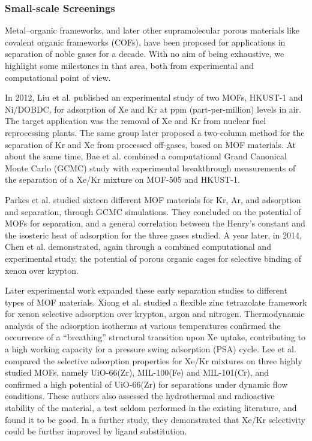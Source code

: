 \documentclass[main.tex]{subfiles}
\begin{document}
\subsubsection{Small-scale Screenings}

Metal--organic frameworks, and later other supramolecular porous materials like covalent organic frameworks (COFs), have been proposed for applications in separation of noble gases for a decade. With no aim of being exhaustive, we highlight some milestones in that area, both from experimental and computational point of view.

In 2012, Liu et al.\cite{Liu_2012} published an experimental study of two MOFs, HKUST-1 and Ni/DOBDC, for adsorption of Xe and Kr at ppm (part-per-million) levels in air. The target application was the removal of Xe and Kr from nuclear fuel reprocessing plants. The same group later proposed a two-column method for the separation of Kr and Xe from processed off-gases\cite{Liu_2014}, based on MOF materials. At about the same time, Bae et al.\cite{Bae_2013} combined a computational Grand Canonical Monte Carlo (GCMC) study with experimental breakthrough measurements of the separation of a Xe/Kr mixture on MOF-505 and HKUST-1.

Parkes et al.\cite{Parkes_2013} studied sixteen different MOF materials for Kr, Ar, and  adsorption and separation, through GCMC simulations. They concluded on the potential of MOFs for separation, and a general correlation between the Henry's constant and the isosteric heat of adsorption for the three gases studied. A year later, in 2014, Chen et al.\cite{Chen_2014} demonstrated, again through a combined computational and experimental study, the potential of porous organic cages for selective binding of xenon over krypton.

Later experimental work expanded these early separation studies to different types of MOF materials. Xiong et al.\cite{Xiong_2015} studied a flexible zinc tetrazolate framework for xenon selective adsorption over krypton, argon and nitrogen. Thermodynamic analysis of the adsorption isotherms at various temperatures confirmed the occurrence of a ``breathing'' structural transition upon Xe uptake, contributing to a high working capacity for a pressure swing adsorption (PSA) cycle. Lee et al.\cite{Lee_2016} compared the selective adsorption properties for Xe/Kr mixtures on three highly studied MOFs, namely UiO-66(Zr), MIL-100(Fe) and MIL-101(Cr), and confirmed a high potential of UiO-66(Zr) for separations under dynamic flow conditions. These authors also assessed the hydrothermal and radioactive stability of the material, a test seldom performed in the existing literature, and found it to be good. In a further study,\cite{Lee_2018} they demonstrated that Xe/Kr selectivity could be further improved by ligand substitution.
\end{document}
